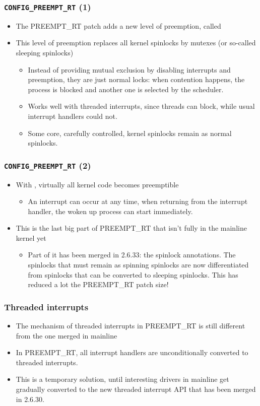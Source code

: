 \begin{frame}
  \frametitle{{\tt CONFIG\_PREEMPT\_RT} (1)}
  \begin{itemize}
  \item The PREEMPT\_RT patch adds a new level of preemption, called
  \item This level of preemption replaces all kernel spinlocks by
    mutexes (or so-called sleeping spinlocks)
    \begin{itemize}
    \item Instead of providing mutual exclusion by disabling
      interrupts and preemption, they are just normal locks: when
      contention happens, the process is blocked and another one is
      selected by the scheduler.
    \item Works well with threaded interrupts, since threads can
      block, while usual interrupt handlers could not.
    \item Some core, carefully controlled, kernel spinlocks remain as
      normal spinlocks.
    \end{itemize}
  \end{itemize}
\end{frame}

\begin{frame}
  \frametitle{{\tt CONFIG\_PREEMPT\_RT} (2)}
  \begin{itemize}
  \item With , virtually all kernel code
    becomes preemptible
    \begin{itemize}
    \item An interrupt can occur at any time, when returning from the
      interrupt handler, the woken up process can start immediately.
    \end{itemize}
  \item This is the last big part of PREEMPT\_RT that isn't fully in
    the mainline kernel yet
    \begin{itemize}
    \item Part of it has been merged in 2.6.33: the spinlock
      annotations. The spinlocks that must remain as spinning
      spinlocks are now differentiated from spinlocks that can be
      converted to sleeping spinlocks. This has reduced a lot the
      PREEMPT\_RT patch size!
    \end{itemize}
  \end{itemize}
\end{frame}

\begin{frame}
  \frametitle{Threaded interrupts}
  \begin{itemize}
  \item The mechanism of threaded interrupts in PREEMPT\_RT is still
    different from the one merged in mainline
  \item In PREEMPT\_RT, all interrupt handlers are unconditionally
    converted to threaded interrupts.
  \item This is a temporary solution, until interesting drivers in
    mainline get gradually converted to the new threaded interrupt API
    that has been merged in 2.6.30.
  \end{itemize}
\end{frame}

